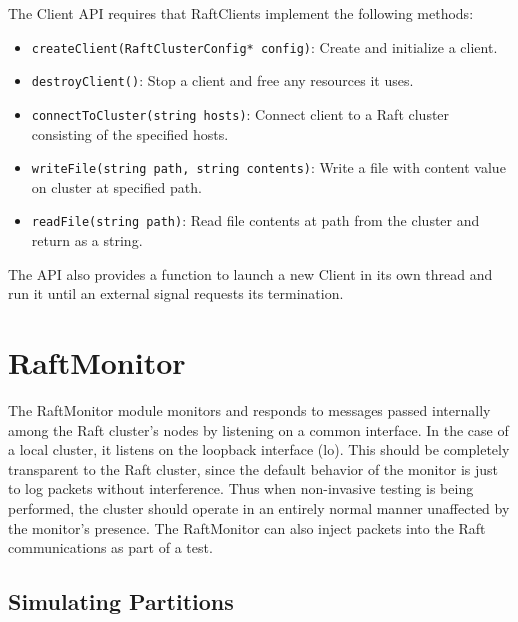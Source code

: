 \documentclass[UTF8]{article}
\begin{document}
The Client API requires that RaftClients implement the following methods:

\begin{itemize}
\item \texttt{createClient(RaftClusterConfig* config)}: Create and initialize a client.
\item \texttt{destroyClient()}: Stop a client and free any resources it uses.
\item \texttt{connectToCluster(string hosts)}: Connect client to a Raft cluster consisting of the specified hosts.
\item \texttt{writeFile(string path, string contents)}: Write a file with content value on cluster at specified path.
\item \texttt{readFile(string path)}: Read file contents at path from the cluster and return as a string.
\end{itemize}

The API also provides a function to launch a new Client in its own thread and run it until an external signal requests its termination.

\section{RaftMonitor}

The RaftMonitor module monitors and responds to messages passed internally among the Raft cluster's nodes by listening on a common interface. In the case of a local cluster, it listens on the loopback interface (lo). This should be completely transparent to the Raft cluster, since the default behavior of the monitor is just to log packets without interference. Thus when non-invasive testing is being performed, the cluster should operate in an entirely normal manner unaffected by the monitor's presence. The RaftMonitor can also inject packets into the Raft communications as part of a test.

\subsection{Simulating Partitions}
\end{document}
